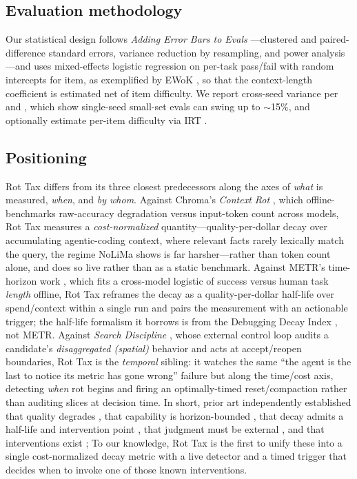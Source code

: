 \documentclass[11pt]{article}
\begin{document}
\subsection{Evaluation methodology}
\label{sec:rw-methodology}

Our statistical design follows \emph{Adding Error Bars to Evals}
\cite{miller2024errorbars}---clustered and paired-difference standard errors,
variance reduction by resampling, and power analysis---and uses mixed-effects
logistic regression on per-task pass/fail with random intercepts for item, as
exemplified by EWoK \cite{ivanova2024ewok}, so that the context-length
coefficient is estimated net of item difficulty. We report cross-seed variance
per \cite{madaan2024variance} and \cite{hochlehnert2025soberlook}, which show
single-seed small-set evals can swing up to $\sim$15\%, and optionally estimate
per-item difficulty via IRT \cite{maiapolo2024tinybenchmarks}.

\subsection{Positioning}
\label{sec:rw-positioning}

Rot Tax differs from its three closest predecessors along the axes of
\emph{what} is measured, \emph{when}, and \emph{by whom}. Against Chroma's
\emph{Context Rot} \cite{hong2025contextrot}, which offline-benchmarks
raw-accuracy degradation versus input-token count across models, Rot Tax
measures a \emph{cost-normalized} quantity---quality-per-dollar decay over
accumulating agentic-coding context, where relevant facts rarely lexically
match the query, the regime NoLiMa \cite{modarressi2025nolima} shows is far
harsher---rather than token count alone, and does so live rather than as a
static benchmark. Against METR's time-horizon work \cite{kwa2025metr}, which
fits a cross-model logistic of success versus human task \emph{length}
offline, Rot Tax reframes the decay as a quality-per-dollar half-life over
spend/context within a single run and pairs the measurement with an actionable
trigger; the half-life formalism it borrows is from the Debugging Decay Index
\cite{adnan2025ddi}, not METR. Against \emph{Search Discipline}
\cite{srinivasan2026searchdiscipline}, whose external control loop audits a
candidate's \emph{disaggregated (spatial)} behavior and acts at accept/reopen
boundaries, Rot Tax is the \emph{temporal} sibling: it watches the same
``the agent is the last to notice its metric has gone wrong'' failure but along
the time/cost axis, detecting \emph{when} rot begins and firing an
optimally-timed reset/compaction rather than auditing slices at decision time.
In short, prior art independently established that quality degrades
\cite{hong2025contextrot,liu2024lostmiddle}, that capability is
horizon-bounded \cite{kwa2025metr}, that decay admits a half-life and
intervention point \cite{adnan2025ddi}, that judgment must be external
\cite{srinivasan2026searchdiscipline}, and that interventions exist
\cite{packer2023memgpt,wang2023recursive,jiang2023llmlingua,lewis2020rag,chopra2026headroom};
To our knowledge, Rot Tax is the first to unify these into a single
cost-normalized decay metric with a live detector and a timed trigger that
decides when to invoke one of those known interventions.
\end{document}
